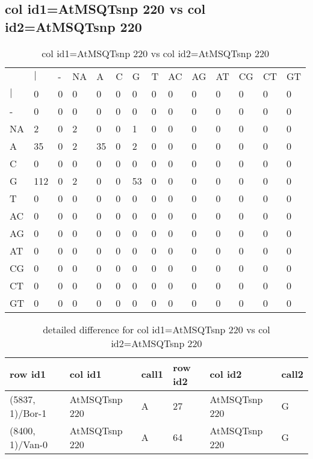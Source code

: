 \subsection{col id1=AtMSQTsnp 220 vs col id2=AtMSQTsnp 220}
\begin{center}
\begin{longtable}{|l|l|l|l|l|l|l|l|l|l|l|l|l|l|}
\caption{col id1=AtMSQTsnp 220 vs col id2=AtMSQTsnp 220} \label{table_dm590}\\
\hline
\\
\hline
&$|$&-&NA&A&C&G&T&AC&AG&AT&CG&CT&GT\\
$|$&0&0&0&0&0&0&0&0&0&0&0&0&0\\
-&0&0&0&0&0&0&0&0&0&0&0&0&0\\
NA&2&0&2&0&0&1&0&0&0&0&0&0&0\\
A&35&0&2&35&0&2&0&0&0&0&0&0&0\\
C&0&0&0&0&0&0&0&0&0&0&0&0&0\\
G&112&0&2&0&0&53&0&0&0&0&0&0&0\\
T&0&0&0&0&0&0&0&0&0&0&0&0&0\\
AC&0&0&0&0&0&0&0&0&0&0&0&0&0\\
AG&0&0&0&0&0&0&0&0&0&0&0&0&0\\
AT&0&0&0&0&0&0&0&0&0&0&0&0&0\\
CG&0&0&0&0&0&0&0&0&0&0&0&0&0\\
CT&0&0&0&0&0&0&0&0&0&0&0&0&0\\
GT&0&0&0&0&0&0&0&0&0&0&0&0&0\\
\hline
\end{longtable}
\end{center}

\begin{center}
\begin{longtable}{|l|l|l|l|l|l|}
\caption{detailed difference for col id1=AtMSQTsnp 220 vs col id2=AtMSQTsnp 220} \label{table_dm591}\\
\hline
row id1&col id1&call1&row id2&col id2&call2\\
\hline
(5837, 1)/Bor-1&AtMSQTsnp 220&A&27&AtMSQTsnp 220&G\\
(8400, 1)/Van-0&AtMSQTsnp 220&A&64&AtMSQTsnp 220&G\\
\hline
\end{longtable}
\end{center}

